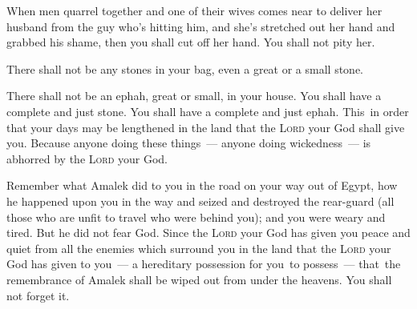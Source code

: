 \begin{inparaenum}
     When men quarrel together and one of their wives comes near to deliver her husband from the guy who's hitting him, and she's stretched out her hand and grabbed his shame,%
     then you shall cut off her hand. You shall not pity her.%
    
     There shall not be any stones in your bag, even a great or a small stone.%
    
     There shall not be an ephah, great or small, in your house.%
     You shall have a complete and just stone. You shall have a complete and just ephah. This\understood\ in order that your days may be lengthened in the land that the \textsc{Lord} your God shall give you.%
     Because anyone doing these things~--- anyone doing wickedness~--- is abhorred by the \textsc{Lord} your God.%
    
     Remember what Amalek did to you in the road on your way out of Egypt,%
     how he happened upon you in the way and seized and destroyed the rear-guard (all those who are unfit to travel who were behind you); and you were weary and tired. But he did not fear God.%
     Since the \textsc{Lord} your God has given you peace and quiet from all the enemies which surround you in the land that the \textsc{Lord} your God has given to you~--- a hereditary possession for you\understood\ to possess~--- that\understood\ the remembrance of Amalek shall be wiped out from under the heavens. You shall not forget it.%
\end{inparaenum}
